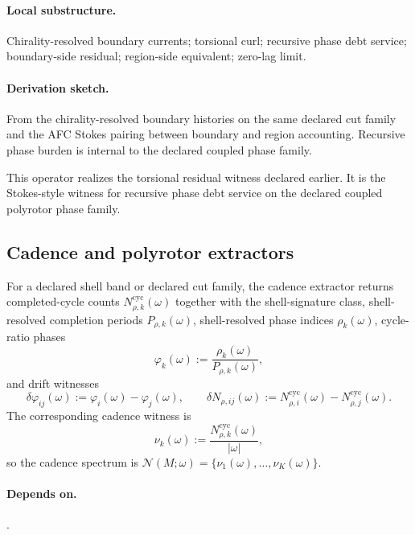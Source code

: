 \paragraph{Local substructure.} Chirality-resolved boundary currents; torsional curl; recursive phase debt service; boundary-side residual; region-side equivalent; zero-lag limit.
\paragraph{Derivation sketch.} From the chirality-resolved boundary histories on the same declared cut family and the AFC Stokes pairing between boundary and region accounting. Recursive phase burden is internal to the declared coupled phase family.
\begin{remarkx}
This operator realizes the torsional residual witness declared earlier. It is the Stokes-style witness for recursive phase debt service on the declared coupled polyrotor phase family.
\end{remarkx}

\subsection{Cadence and polyrotor extractors}\label{subsec:cadence-polyrotor-operators}
\begin{definition}
\label{def:cadence-operator}
For a declared shell band or declared cut family, the cadence extractor returns completed-cycle counts $N_{\rho,k}^{\mathrm{cyc}}(\omega)$ together with the shell-signature class, shell-resolved completion periods $P_{\rho,k}(\omega)$, shell-resolved phase indices $\rho_k(\omega)$, cycle-ratio phases
\[
\varphi_k(\omega):=\frac{\rho_k(\omega)}{P_{\rho,k}(\omega)},
\]
and drift witnesses
\[
\delta\varphi_{ij}(\omega):=\varphi_i(\omega)-\varphi_j(\omega),
\qquad
\delta N_{\rho,ij}(\omega):=N_{\rho,i}^{\mathrm{cyc}}(\omega)-N_{\rho,j}^{\mathrm{cyc}}(\omega).
\]
The corresponding cadence witness is
\[
\nu_k(\omega):=\frac{N_{\rho,k}^{\mathrm{cyc}}(\omega)}{|\omega|},
\]
so the cadence spectrum is $\mathcal N(M;\omega)=\{\nu_1(\omega),\ldots,\nu_K(\omega)\}$.
\end{definition}

\paragraph{Depends on.} .
